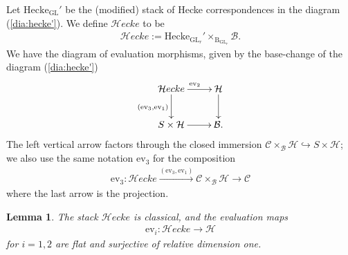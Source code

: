 \documentclass[11pt,oneside,a4paper,mathscr]{amsart}
\newtheorem{lemma}[thm]{Lemma}
\theoremstyle{definition}
\newcommand{\cH}{\mathcal{H}}
\newcommand{\cB}{\mathcal{B}}
\newcommand{\cC}{\mathcal{C}}
\newcommand{\ev}{\mathrm{ev}}
\newcommand{\cHecke}{\mathcal{H}ecke}
\newcommand{\rB}{\mathrm{B}}
\newcommand{\GL}{\operatorname{GL}}
\begin{document}
Let $\mathrm{Hecke}_{\GL}'$ be the (modified) stack of Hecke correspondences 
in the diagram (\ref{dia:hecke'}). 
We define $\cHecke$ to be 
\begin{align*}
    \cHecke:=\mathrm{Hecke}_{\GL_r}'\times_{\rB_{\GL_r}} \cB.
\end{align*}
We have the diagram of evaluation morphisms, given by the base-change of 
the diagram (\ref{dia:hecke'})
\begin{align*}
    \xymatrix{
\cHecke \ar[r]^{\ev_2} \ar[d]_{(\ev_3, \ev_1)} & \cH \ar[d] \\
S\times \cH \ar[r] & \cB.
    }
\end{align*}
The left vertical arrow factors through the closed 
immersion $\cC\times_{\cB}\cH \hookrightarrow S\times \cH$; 
we also use the same notation $\ev_3$ for the composition 
\begin{align*}
   \ev_3 \colon \cHecke \stackrel{(\ev_3, \ev_1)}{\to} \cC\times_{\cB}\cH 
   \to \cC
\end{align*}
where the last arrow is the projection. 

\begin{lemma}\label{lem:heckeclass}
The stack $\cHecke$ is classical, and the evaluation maps 
\begin{align*}
    \ev_i \colon \cHecke \to \cH
\end{align*}
for $i=1, 2$ are flat and surjective of relative dimension one. 
\end{lemma}
\end{document}
